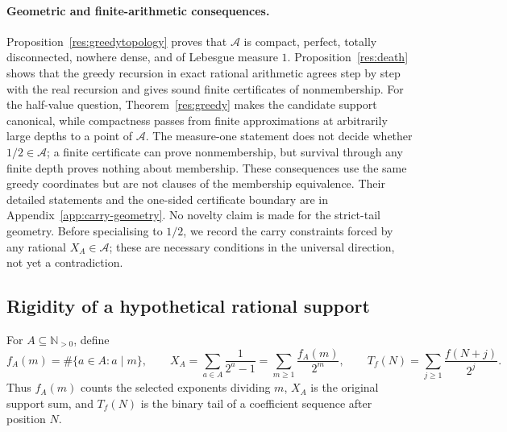 \documentclass[11pt]{article}
\theoremstyle{definition}
\theoremstyle{remark}
\newcommand{\Npos}{\mathbb{N}_{>0}}
\begin{document}
\paragraph{Geometric and finite-arithmetic consequences.}
Proposition~\ref{res:greedytopology} proves that \(\mathcal A\) is compact,
perfect, totally disconnected, nowhere dense, and of Lebesgue measure \(1\).
Proposition~\ref{res:death} shows that the greedy recursion in exact rational
arithmetic agrees step by step with the real recursion and gives sound finite
certificates of nonmembership.
For the half-value question, Theorem~\ref{res:greedy} makes the candidate
support canonical, while compactness passes from finite approximations at
arbitrarily large depths to a point of \(\mathcal A\).  The measure-one statement does
not decide whether \(1/2\in\mathcal A\); a finite certificate can prove
nonmembership, but survival through any finite depth proves nothing about
membership.  These consequences use the same greedy coordinates but are not
clauses of the membership equivalence.  Their detailed statements and the
one-sided certificate boundary are in Appendix~\ref{app:carry-geometry}.  No
novelty claim is made for the strict-tail geometry.  Before specialising to
\(1/2\), we record the carry constraints forced by any rational
\(X_A\in\mathcal A\); these are necessary conditions in the universal
direction, not yet a contradiction.

\subsection{Rigidity of a hypothetical rational support}

For \(A\subseteq\Npos\), define
\[
 f_A(m)=\#\{a\in A:a\mid m\},
 \qquad
 X_A=\sum_{a\in A}\frac1{2^a-1}
     =\sum_{m\geq1}\frac{f_A(m)}{2^m},
 \qquad
 T_f(N)=\sum_{j\geq1}\frac{f(N+j)}{2^j}.
\]
Thus \(f_A(m)\) counts the selected exponents dividing \(m\), \(X_A\) is the
original support sum, and \(T_f(N)\) is the binary tail of a coefficient
sequence after position \(N\).
\end{document}
